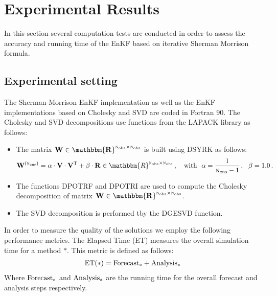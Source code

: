 \documentclass[12pt]{article}
\newcommand{\Nobs}{\textsc{n}_{{\rm obs}}}
\newcommand{\Nens}{\textsc{n}_{{\rm ens}}}
\newcommand{\R}{{\bf R}}
\newcommand{\W}[1]{{{\bf W}^{\left ( {\rm #1} \right )}}}
\newcommand{\V}{{\bf V}}
\renewcommand{\Re}{\mathbbm{R}}
\begin{document}
\section{Experimental Results}
\label{sec:results}


In this section several computation tests are conducted in order to assess the accuracy and running time of the EnKF based on iterative Sherman Morrison formula. 
\subsection{Experimental setting}
\label{Results:experimental-settings}


The Sherman-Morrison EnKF implementation as well as the EnKF implementations based on Cholesky and SVD are coded in Fortran 90. The Cholesky and SVD decompositions use functions from the LAPACK library \cite{Anderson90} as follows: 
\begin{itemize}
\item The matrix $\bf W \in \Re^{\Nobs \times \Nobs}$ is built using DSYRK as follows:
\begin{eqnarray} \nonumber
\label{Results:W-computation}
\displaystyle \W{\Nens} = \alpha \cdot \V \cdot \V^{\rm T} + \beta \cdot \R \in \Re^{\Nobs \times \Nobs}\,,\quad
\mbox{with}~~ \alpha = \frac{1}{{\Nens-1}}\,,~~\beta = 1.0\,.
\end{eqnarray}
\item The functions DPOTRF and DPOTRI are used to compute the Cholesky decomposition of matrix $\bf W \in \Re^{\Nobs \times \Nobs}$.
\item The SVD decomposition is performed tby the DGESVD function.
\end{itemize}

In order to measure the quality of the solutions we employ the following performance metrics. The Elapsed Time (ET) measures the overall simulation time
for a method $*$. This metric is defined as follows:
\begin{eqnarray}
\label{Results:Elapsed-time-metric}
\displaystyle \rm ET(*) = Forecast_{*}+Analysis_{*}
\end{eqnarray}
Where $\rm Forecast_{*}$ and $\rm Analysis_{*}$ are the running time for the overall forecast and analysis steps respectively. 
\end{document}
